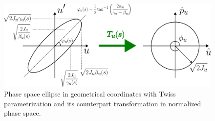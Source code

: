 \begin{figure}[H]
    \centering
    \includegraphics[width=\columnwidth]{chapter2/ellipses.png}
    \caption{Phase space ellipse in geometrical coordinates with Twiss parametrization and its counterpart transformation in normalized phase space.}
    \label{fig:ellipses}
 \end{figure}

